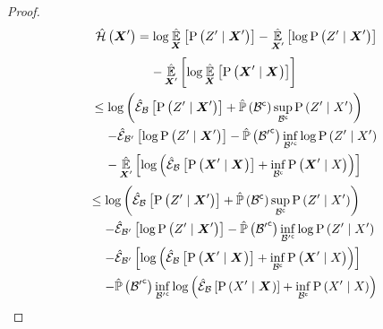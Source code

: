 \begin{proof}
	\begin{align}
		\begin{split}
			\entropyEstimator{\statesRV{}^\prime}&=\log\estimator{\probcond{\observations{}^\prime}{\statesRV{}^\prime}}{\statesRV{}}-\estimator{\log\probcond{\observations{}^\prime}{\statesRV{}^\prime}}{\statesRV{}^\prime}\\
			&\phantomeq-\estimator{\log\estimator{\probcond{\statesRV{}^\prime}{\statesRV{}}}{\statesRV{}}}{\statesRV{}^\prime}
		\end{split}\\
		\begin{split}
			&\leq\log\left(\partialestimator{\probcond{\observations{}^\prime}{\statesRV{}^\prime}}{\subSpace}+\estimatedmeasure{\stcomp{\subSpace}}\sup_{\stcomp{\subSpace}}\probcond{\observations{}^\prime}{\states{}^\prime}\right)\\
			&\phantomeq-\partialestimator{\log\probcond{\observations{}^\prime}{\statesRV{}^\prime}}{\subSpace^\prime}-\estimatedmeasure{\stcomp{\subSpace^\prime}}\inf_{\stcomp{\subSpace^\prime}}\log\probcond{\observations{}^\prime}{\states{}^\prime}\\
			&\phantomeq-\estimator{\log\left(\partialestimator{\probcond{\statesRV{}^\prime}{\statesRV{}}}{\subSpace}+\inf_{\stcomp{\subSpace}}\probcond{\statesRV{}^\prime}{\states{}}\right)}{\statesRV{}^\prime}
		\end{split}\\
		\begin{split}
			&\leq\log\left(\partialestimator{\probcond{\observations{}^\prime}{\statesRV{}^\prime}}{\subSpace}+\estimatedmeasure{\stcomp{\subSpace}}\sup_{\stcomp{\subSpace}}\probcond{\observations{}^\prime}{\states{}^\prime}\right)\\
			&\phantomeq-\partialestimator{\log\probcond{\observations{}^\prime}{\statesRV{}^\prime}}{\subSpace^\prime}-\estimatedmeasure{\stcomp{\subSpace^\prime}}\inf_{\stcomp{\subSpace^\prime}}\log\probcond{\observations{}^\prime}{\states{}^\prime}\\
			&\phantomeq-\partialestimator{\log\left(\partialestimator{\probcond{\statesRV{}^\prime}{\statesRV{}}}{\subSpace}+\inf_{\stcomp{\subSpace}}\probcond{\statesRV{}^\prime}{\states{}}\right)}{\subSpace^\prime}\\
			&\phantomeq-\estimatedmeasure{\stcomp{\subSpace^\prime}}\inf_{\stcomp{\subSpace^\prime}}\log\left(\partialestimator{\probcond{\states{}^\prime}{\statesRV{}}}{\subSpace}+\inf_{\stcomp{\subSpace}}\probcond{\states{}^\prime}{\states{}}\right)

\end{split}
\end{align}
\end{proof}
